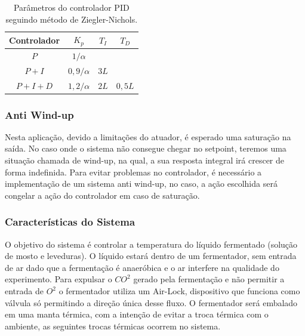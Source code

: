 \begin{table}[H]
    \begin{center}
        \begin{tabular}{ |c|c|c|c| } 
            \hline
            Controlador & \(K_p\) & \(T_I\) & \(T_D\) \\
            \hline
            \(P\) & \(1/\alpha\) &  & \\
            \hline
            \(P + I\) & \(0,9/\alpha\) & \(3L\) & \\
            \hline
            \(P + I + D\) & \(1,2/\alpha\) & \(2L\) & \(0,5L\) \\
            \hline
        \end{tabular}
        \caption{\label{tab:parametros_ziegler} Parâmetros do controlador PID seguindo método de Ziegler-Nichols.}
    \end{center}
\end{table}



\subsubsection{Anti Wind-up}


Nesta aplicação, devido a limitações do atuador, é esperado uma saturação na saída. No caso onde o sistema não consegue chegar no setpoint, teremos uma situação chamada de wind-up, na qual, a sua resposta integral irá crescer de forma indefinida. Para evitar problemas no controlador, é necessário a implementação de um sistema anti wind-up, no caso, a ação escolhida será congelar a ação do controlador em caso de saturação.  


\subsubsection*{Características do Sistema}

O objetivo do sistema é controlar a temperatura do líquido fermentado (solução de mosto e leveduras). O líquido estará dentro de um fermentador, sem entrada de ar dado que a fermentação é anaeróbica e o ar interfere na qualidade do experimento. Para expulsar o $CO^2$ gerado pela fermentação e não permitir a entrada de $O^2$ o fermentador utiliza um Air-Lock, dispositivo que funciona como válvula só permitindo a direção única desse fluxo. O fermentador será embalado em uma manta térmica, com a intenção de evitar a troca térmica com o ambiente, as seguintes trocas térmicas ocorrem no sistema. 


